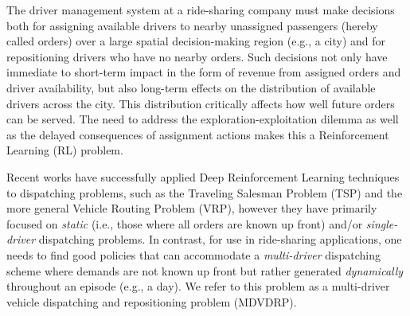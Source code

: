 The driver management 
system at a ride-sharing company must make decisions both for assigning available drivers to nearby unassigned passengers (hereby called orders) over a large spatial decision-making region (e.g., a city) and for repositioning drivers who have no nearby orders. Such decisions not only have immediate to short-term impact in the form of revenue from assigned orders and driver availability, but also long-term effects on the distribution of available drivers across the city. This distribution critically affects how well future orders can be served. The need to address the exploration-exploitation dilemma as well as the delayed consequences of assignment actions makes this a Reinforcement Learning (RL) problem.

Recent works \cite{bello2016neural,nazari2018deep} have successfully applied Deep Reinforcement Learning techniques to dispatching problems, such as the Traveling Salesman Problem (TSP) and the more general Vehicle Routing Problem (VRP), however they have primarily focused on {\em static} (i.e., those where all orders are known up front) and/or {\em single-driver} dispatching problems. In contrast, for use in ride-sharing applications, one needs to find good policies that can accommodate a {\em multi-driver} dispatching scheme where demands are not known up front but rather generated {\em dynamically} throughout an episode (e.g., a day). We refer to 
this problem as a multi-driver vehicle dispatching and repositioning problem (MDVDRP). 

